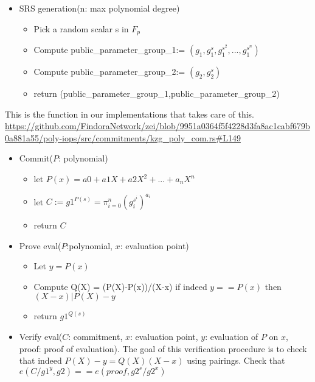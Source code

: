 \documentclass{article}
\begin{document}
\begin{itemize}
    \item SRS generation(n: max polynomial degree)\\
    \begin{itemize}
        \item  Pick a random scalar s in $F_p$\\
        \item Compute public\_parameter\_group\_1:= $(g_1,g_1^s,g_1^{s^2},...,g_1^{s^n})$\\
        \item Compute public\_parameter\_group\_2:= $(g_2,g_2^s)$\\
        \item return (public\_parameter\_group\_1,public\_parameter\_group\_2)\\
    \end{itemize}
    
\end{itemize}
    This is the function in our implementations that takes care of this.\\
    \url{https://github.com/FindoraNetwork/zei/blob/9951a0364f5f4228d3fa8ac1cabf679b0a881a55/poly-iops/src/commitments/kzg_poly_com.rs#L149}\\
    
\begin{itemize}
    \item Commit($P$: polynomial)\\
    \begin{itemize}
        \item let $P(x) = a0 + a1X + a2X^2 + ...+ a_nX^n$\\
        \item let $C := g1^{P(s)} = \pi_{i=0}^n (g_i^{s^i})^{a_i}$\\
        \item return $C$\\ 
    \end{itemize}


    \item Prove eval($P$:polynomial, $x$: evaluation point)
    \begin{itemize}
        \item Let $y=P(x)$\\
        \item Compute Q(X) = (P(X)-P(x))/(X-x)   if indeed $y==P(x)$ then $(X-x)|P(X)-y$\\
        \item return $g1^{Q(s)}$\\
    \end{itemize}

    \item Verify eval($C$: commitment, $x$: evaluation point, $y$: evaluation of $P$ on $x$, proof: proof of evaluation). The goal of this verification procedure is to check that indeed $P(X)-y=Q(X)(X-x)$ using pairings. Check that $e(C/g1^y,g2) == e(proof,g2^s/g2^x)$\\

\end{itemize}
\end{document}
